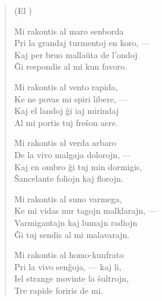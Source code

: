 \begin{verse}
\begin{center}
\footnotesize (El )
\end{center}
                     Mi rakontis al maro senborda\\
                     Pri la grandaj turmentoj en koro, ---\\
                     Kaj per bruo malla\u uta de l'ondoj\\
                     \^Gi respondis al mi kun favoro.

                     Mi rakontis al vento rapida,\\
                     Ke ne povas mi spiri libere, ---\\
                     Kaj el landoj \^gi iaj mirindaj\\
                     Al mi portis tuj fre\^son aere.

                     Mi rakontis al verda arbaro\\
                     De la vivo malgaja dolorojn, ---\\
                     Kaj en ombro \^gi tuj min dormigis,\\
                     \^Sancelante foliojn kaj florojn.

                     Mi rakontis al suno varmega,\\
                     Ke mi vidas nur tagojn malklarajn, ---\\
                     Varmigantajn kaj lumajn radiojn\\
                     \^Gi tuj sendis al mi malavarajn.

                     Mi rakontis al homo-kunfrato\\
                     Pri la vivo sen\^goja, --- kaj li,\\\newpage
                     Iel strange movinte la \^sultrojn,\\
                     Tre rapide foriris de mi.
\end{verse}

\smallrule{}